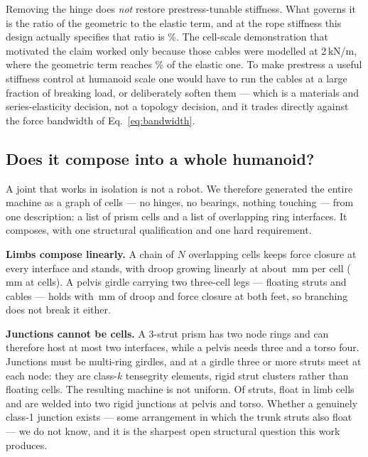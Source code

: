 \documentclass[conference]{IEEEtran}
\begin{document}
Removing the hinge does \emph{not} restore prestress-tunable stiffness. What
governs it is the ratio of the geometric to the elastic term, and at the rope
stiffness this design actually specifies that ratio is
\jointGeomElasticRope\%. The cell-scale demonstration that motivated the claim
worked only because those cables were modelled at 2\,kN/m, where the geometric
term reaches \jointGeomElasticSoft\% of the elastic one. To make prestress a
useful stiffness control at humanoid scale one would have to run the cables at
a large fraction of breaking load, or deliberately soften them --- which is a
materials and series-elasticity decision, not a topology decision, and it
trades directly against the force bandwidth of Eq.~\eqref{eq:bandwidth}.

\subsection{Does it compose into a whole humanoid?}
\label{sec:cellgraph}
A joint that works in isolation is not a robot. We therefore generated the
entire machine as a graph of cells --- no hinges, no bearings, nothing
touching --- from one description: a list of prism cells and a list of
overlapping ring interfaces. It composes, with one structural qualification
and one hard requirement.

\textbf{Limbs compose linearly.} A chain of $N$ overlapping cells keeps force
closure at every interface and stands, with droop growing linearly at about
\cellChainPer\,mm per cell (\cellChainDroop\,mm at \cellChainMax{} cells). A
pelvis girdle carrying two three-cell legs --- \lbStruts{} floating struts and
\lbCables{} cables --- holds with \lbDroop\,mm of droop and force closure at
both feet, so branching does not break it either.

\textbf{Junctions cannot be cells.} A 3-strut prism has two node rings and can
therefore host at most two interfaces, while a pelvis needs three and a torso
four. Junctions must be multi-ring girdles, and at a girdle three or more
struts meet at each node: they are class-$k$ tensegrity elements, rigid strut
clusters rather than floating cells. The resulting machine is not uniform. Of
\cgStruts{} struts, \cgCellStruts{} float in limb cells and
\cgClusterStruts{} are welded into two rigid junctions at pelvis and torso.
Whether a genuinely class-1 junction exists --- some arrangement in which the
trunk struts also float --- we do not know, and it is the sharpest open
structural question this work produces.
\end{document}
